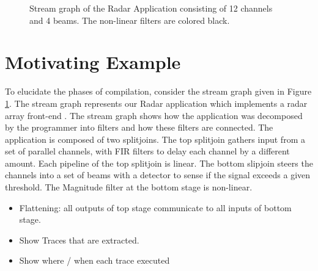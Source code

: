 \begin{figure}
\centering
{}
\caption{Stream graph of the Radar Application consisting of 12
channels and 4 beams. The non-linear filters are colored black. 
\label{fig:beam-graph}}
\end{figure}

\section{Motivating Example}
To elucidate the phases of compilation, consider the stream graph
given in Figure \ref{fig:beam-graph}.  The stream graph represents our
Radar application which implements a radar array front-end \cite{pca}.
The stream graph shows how the application was decomposed by the
programmer into filters and how these filters are connected.  The
application is composed of two splitjoins.  The top splitjoin gathers
input from a set of parallel channels, with FIR filters to delay each
channel by a different amount.  Each pipeline of the top splitjoin is
linear.  The bottom slipjoin steers the channels into a set of beams
with a detector to sense if the signal exceeds a given threshold.  
The Magnitude filter at the bottom stage is non-linear.  

\begin{itemize}
\item Flattening: all outputs of top stage communicate to all inputs
of bottom stage.
\item Show Traces that are extracted.
\item Show where / when each trace executed
\end{itemize}
